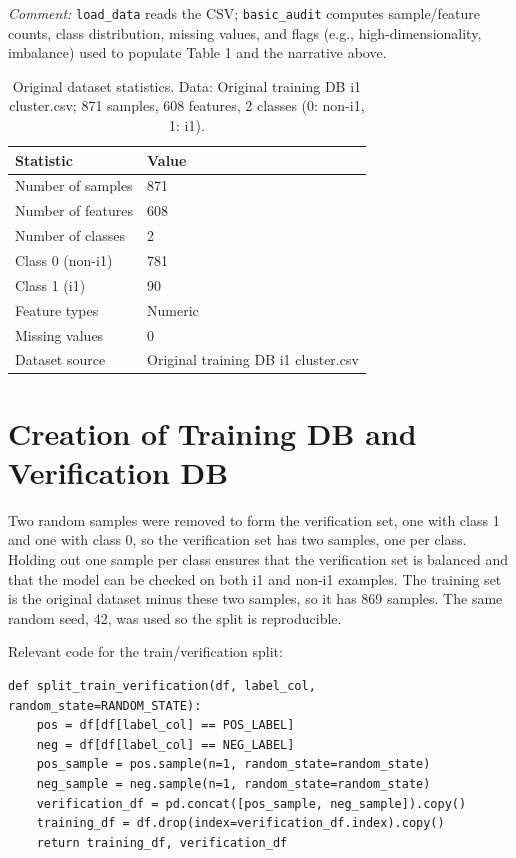 \documentclass[11pt]{article}
\begin{document}
\textit{Comment:} \texttt{load\_data} reads the CSV; \texttt{basic\_audit} computes sample/feature counts, class distribution, missing values, and flags (e.g., high-dimensionality, imbalance) used to populate Table 1 and the narrative above.

\begin{table}[H]
\centering
\caption{Original dataset statistics. Data: Original training DB i1 cluster.csv; 871 samples, 608 features, 2 classes (0: non-i1, 1: i1).}
\begin{tabular}{ll}
\toprule
\textbf{Statistic} & \textbf{Value} \\
\midrule
Number of samples & 871 \\
Number of features & 608 \\
Number of classes & 2 \\
Class 0 (non-i1) & 781 \\
Class 1 (i1) & 90 \\
Feature types & Numeric \\
Missing values & 0 \\
Dataset source & Original training DB i1 cluster.csv \\
\bottomrule
\end{tabular}
\end{table}

\section{Creation of Training DB and Verification DB}

Two random samples were removed to form the verification set, one with class 1 and one with class 0, so the verification set has two samples, one per class. Holding out one sample per class ensures that the verification set is balanced and that the model can be checked on both i1 and non-i1 examples. The training set is the original dataset minus these two samples, so it has 869 samples. The same random seed, 42, was used so the split is reproducible.

Relevant code for the train/verification split:

\begin{lstlisting}[style=pythonstyle]
def split_train_verification(df, label_col, random_state=RANDOM_STATE):
    pos = df[df[label_col] == POS_LABEL]
    neg = df[df[label_col] == NEG_LABEL]
    pos_sample = pos.sample(n=1, random_state=random_state)
    neg_sample = neg.sample(n=1, random_state=random_state)
    verification_df = pd.concat([pos_sample, neg_sample]).copy()
    training_df = df.drop(index=verification_df.index).copy()
    return training_df, verification_df
\end{lstlisting}
\end{document}
